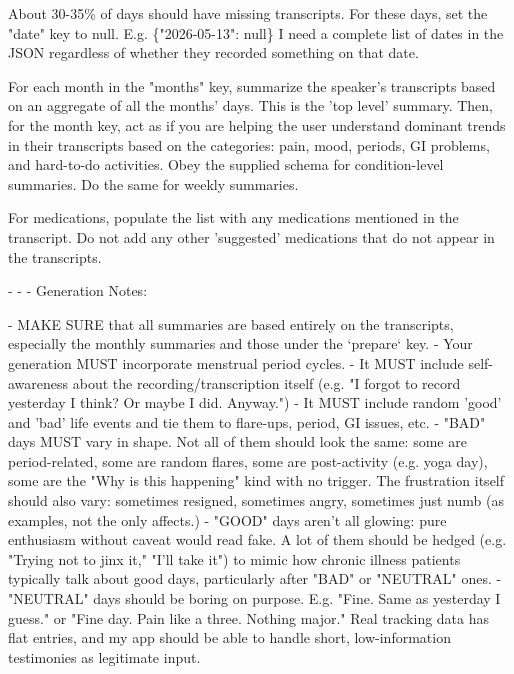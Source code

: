 About 30-35\% of days should have missing transcripts. For these days, set the "date" key to null. E.g. \{"2026-05-13": null\} I need a complete list of dates in the JSON regardless of whether they recorded something on that date.

For each month in the "months" key, summarize the speaker's transcripts based on an aggregate of all the months' days. This is the 'top level' summary. Then, for the month key, act as if you are helping the user understand dominant trends in their transcripts based on the categories: pain, mood, periods, GI problems, and hard-to-do activities. Obey the supplied schema for condition-level summaries. Do the same for weekly summaries.

For medications, populate the list with any medications mentioned in the transcript. Do not add any other 'suggested' medications that do not appear in the transcripts.

- - -
Generation Notes:

- MAKE SURE that all summaries are based entirely on the transcripts, especially the monthly summaries and those under the `prepare` key.
- Your generation MUST incorporate menstrual period cycles.
- It MUST include self-awareness about the recording/transcription itself (e.g. "I forgot to record yesterday I think? Or maybe I did. Anyway.")
- It MUST include random 'good' and 'bad' life events and tie them to flare-ups, period, GI issues, etc.
- "BAD" days MUST vary in shape. Not all of them should look the same: some are period-related, some are random flares, some are post-activity (e.g. yoga day), some are the "Why is this happening" kind with no trigger. The frustration itself should also vary: sometimes resigned, sometimes angry, sometimes just numb (as examples, not the only affects.)
- "GOOD" days aren't all glowing: pure enthusiasm without caveat would read fake. A lot of them should be hedged (e.g. "Trying not to jinx it," "I'll take it") to mimic how chronic illness patients typically talk about good days, particularly after "BAD" or "NEUTRAL" ones.
- "NEUTRAL" days should be boring on purpose. E.g. "Fine. Same as yesterday I guess." or "Fine day. Pain like a three. Nothing major." Real tracking data has flat entries, and my app should be able to handle short, low-information testimonies as legitimate input.

\endgroup
